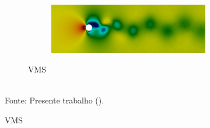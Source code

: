 \begin{figure}[h!]
\begin{subfigure}{\textwidth}
\begin{subfigure}{.49\textwidth}
        \end{subfigure}
        \begin{subfigure}{.49\textwidth}
            \includegraphics[width=\linewidth]{Figuras/cylinder/analise2/VMS-Qua-p.png}
        \end{subfigure}
        \caption{VMS}
    \end{subfigure}
    \\Fonte: Presente trabalho (\the\year).
    \label{fig:vel-pre-Qua}
\end{figure}

